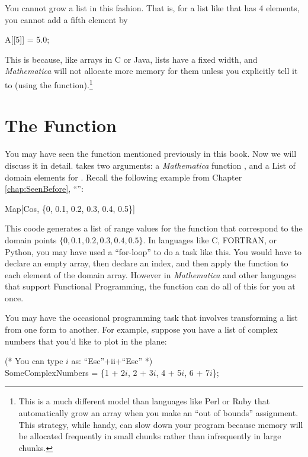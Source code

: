 You cannot grow a list in this fashion. That is, for a list like  that has 4 elements, you cannot add a fifth element by 
\begin{code}
	   A[[5]] = 5.0;
\end{code}
This is because, like arrays in C or Java, lists have a fixed width, and \emph{Mathematica} will not allocate more memory for them unless you explicitly tell it to (using the  function).\footnote{This is a much different model than languages like Perl or Ruby that automatically grow an array when you make an ``out of bounds'' assignment. This strategy, while handy, can slow down your program because memory will be allocated frequently in small chunks rather than infrequently in large chunks.}

\section{The  Function}

You may have seen the  function mentioned previously in this book. Now we will discuss it in detail.  takes two arguments: a \emph{Mathematica} function , and a List of domain elements for . Recall the following example from Chapter \ref{chap:SeenBefore}, ``'':

\begin{code}
	   Map[Cos, \{0, 0.1, 0.2, 0.3, 0.4, 0.5\}]
\end{code}

This coode generates a list of range values for the  function that correspond to the domain points $\{0, 0.1, 0.2, 0.3, 0.4, 0.5\}$. In languages like C, FORTRAN, or Python, you may have used a ``for-loop'' to do a task like this. You would have to declare an empty array, then declare an index, and then apply the function to each element of the domain array. However in \emph{Mathematica} and other languages that support Functional Programming, the  function can do all of this for you at once. 

You may have the occasional programming task that involves transforming a list from one form to another. For example, suppose you have a list of complex numbers that you'd like to plot in the plane:

\begin{code}
	   (* You can type $i$ as: ``Esc''+ii+``Esc'' *)\\
	   SomeComplexNumbers = \{1 + 2$i$, 2 + 3$i$, 4 + 5$i$, 6 + 7$i$\};
\end{code}

